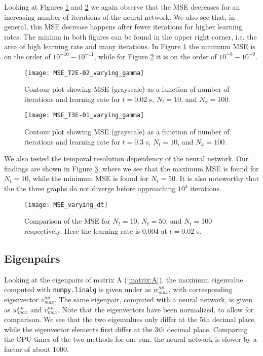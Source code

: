 Looking at Figures \ref{fig:MSE_T2E-02_varying_gamma} and \ref{fig:MSE_T3E-01_varying_gamma} we again observe that the MSE decreases for an increasing number of iterations of the neural network. We also see that, in general, this MSE decrease happens after fewer iterations for higher learning rates. The minima in both figures can be found in the upper right corner, i.e. the area of high learning rate and many iterations. In Figure \ref{fig:MSE_T2E-02_varying_gamma} the minimum MSE is on the order of $10^{-10} - 10^{-11}$, while for Figure \ref{fig:MSE_T3E-01_varying_gamma} it is on the order of $10^{-8} - 10^{-9}$.
\begin{figure}[htbp]
 	\centering
 	\texttt{[image: MSE\_T2E-02\_varying\_gamma]}
 	\caption{Contour plot showing MSE (grayscale) as a function of number of iterations and learning rate for $t=0.02$ s, $N_t = 10$, and $N_x = 100$.}
  \label{fig:MSE_T2E-02_varying_gamma}
\end{figure}

\begin{figure}[htbp]
 	\centering
 	\texttt{[image: MSE\_T3E-01\_varying\_gamma]}
 	\caption{Contour plot showing MSE (grayscale) as a function of number of iterations and learning rate for $t=0.3$ s, $N_t = 10$, and $N_x = 100$.}
  \label{fig:MSE_T3E-01_varying_gamma}
\end{figure}

We also tested the temporal resolution dependency of the neural network. Our findings are shown in Figure \ref{fig:MSE_varying_dt}, where we see that the maximum MSE is found for $N_t = 10$, while the minimum MSE is found for $N_t = 50$. It is also noteworthy that the the three graphs do not diverge before approaching $10^4$ iterations.
\begin{figure}[htbp]
 	\centering
 	\texttt{[image: MSE\_varying\_dt]}
 	\caption{Comparison of the MSE for $N_t = 10$, $N_t = 50$, and $N_t = 100$ respectively. Here the learning rate is $0.004$ at $t=0.02$ s.}
  \label{fig:MSE_varying_dt}
\end{figure}


\subsection{Eigenpairs}
Looking at the eigenpairs of matrix A (\ref{matrix:A}), the maximum eigenvalue computed with  \texttt{numpy.linalg} is given under as $w_{max}^{np}$, with corresponding eigenvector $v_{max}^{np}$. The same eigenpair, computed with a neural network, is given as $w_{max}^{nn}$ and $v_{max}^{nn}$. Note that the eigenvectors have been normalized, to allow for comparison. We see that the two eigenvalues only differ at the 5th decimal place, while the eigenvector elements first differ at the 3th decimal place. Comparing the CPU times of the two methods for one run, the neural network is slower by a factor of about 1000.

